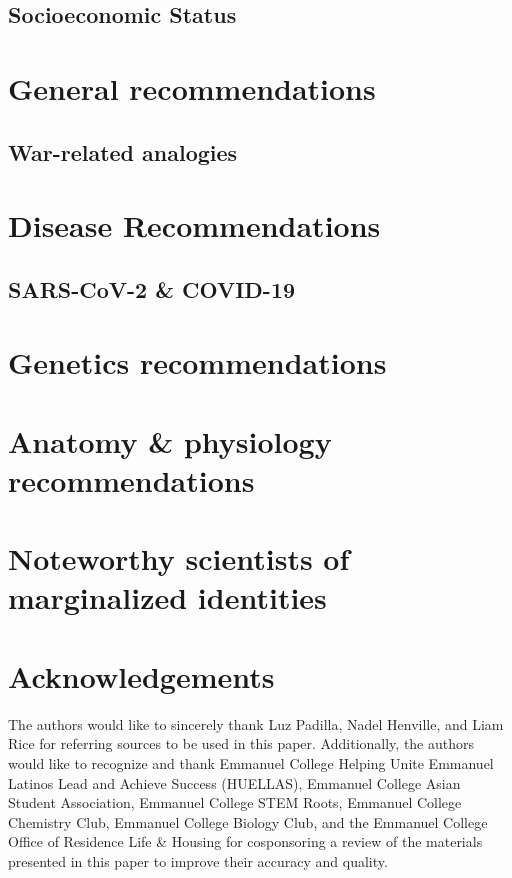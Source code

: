 \documentclass[10pt, twocolumn]{article}
\begin{document}
    \subsection{Socioeconomic Status}

\section{General recommendations}
    
    \subsection{War-related analogies}


\section{Disease Recommendations}

        \subsection{SARS-CoV-2 \& COVID-19}

\section{Genetics recommendations}

\section{Anatomy \& physiology recommendations}

\section{Noteworthy scientists of marginalized identities}

\section*{Acknowledgements}

The authors would like to sincerely thank Luz Padilla, Nadel Henville, and Liam Rice for referring sources to be used in this paper. Additionally, the authors would like to recognize and thank Emmanuel College Helping Unite Emmanuel Latinos Lead and Achieve Success (HUELLAS), Emmanuel College Asian Student Association, Emmanuel College STEM Roots, Emmanuel College Chemistry Club, Emmanuel College Biology Club, and the Emmanuel College Office of Residence Life \& Housing for cosponsoring a review of the materials presented in this paper to improve their accuracy and quality. 
\end{document}
